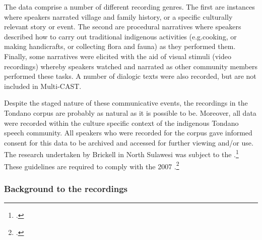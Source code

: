 The data comprise a number of different recording genres. The first are instances where speakers narrated village and family history, or a specific culturally relevant story or event. The second are procedural narratives where speakers described how to carry out traditional indigenous activities (e.g.\@ cooking, or making handicrafts, or collecting flora and fauna) as they performed them. Finally, some narratives were elicited with the aid of visual stimuli (video recordings) whereby speakers watched and narrated as other community members performed these tasks. A number of dialogic texts were also recorded, but are not included in Multi-CAST.

Despite the staged nature of these communicative events, the recordings in the Tondano corpus are probably as natural as it is possible to be. Moreover, all data were recorded within the culture specific context of the indigenous Tondano speech community. All speakers who were recorded for the corpus gave informed consent for this data to be archived and accessed for further viewing and/or use. The research undertaken by Brickell in North Sulawesi was subject to the .\footnote{.} These guidelines are required to comply with the 2007 .\footnote{.}



\subsubsection*{Background to the recordings}

